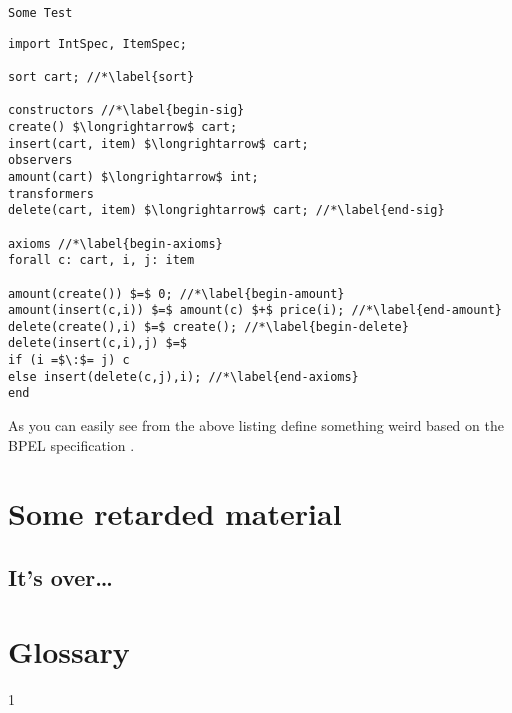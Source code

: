 \documentclass[mscthesis]{usiinfthesis}
\begin{document}
\texttt{Some Test}
\begin{lstlisting}
import IntSpec, ItemSpec;

sort cart; //*\label{sort}

constructors //*\label{begin-sig}
create() $\longrightarrow$ cart;
insert(cart, item) $\longrightarrow$ cart;
observers
amount(cart) $\longrightarrow$ int;
transformers
delete(cart, item) $\longrightarrow$ cart; //*\label{end-sig}

axioms //*\label{begin-axioms}
forall c: cart, i, j: item 

amount(create()) $=$ 0; //*\label{begin-amount}
amount(insert(c,i)) $=$ amount(c) $+$ price(i); //*\label{end-amount}
delete(create(),i) $=$ create(); //*\label{begin-delete}
delete(insert(c,i),j) $=$
if (i =$\:$= j) c
else insert(delete(c,j),i); //*\label{end-axioms}
end
\end{lstlisting}

As you can easily see from the above listing \citet{bbggs:iet07}
define something weird based on the BPEL specification
\citep{bpelspec}.
\nocite{*}

\appendix %

\chapter{Some retarded material}
\section{It's over\dots}

\backmatter

\chapter{Glossary} %

%
%



1
\end{document}
